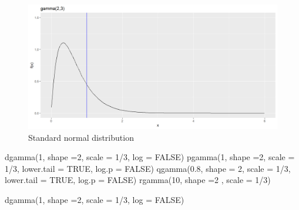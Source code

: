\documentclass[
]{book}
\newenvironment{Shaded}{\begin{snugshade}}{\end{snugshade}}
\newcommand{\AttributeTok}[1]{\textcolor[rgb]{0.77,0.63,0.00}{#1}}
\newcommand{\ConstantTok}[1]{\textcolor[rgb]{0.00,0.00,0.00}{#1}}
\newcommand{\DecValTok}[1]{\textcolor[rgb]{0.00,0.00,0.81}{#1}}
\newcommand{\FloatTok}[1]{\textcolor[rgb]{0.00,0.00,0.81}{#1}}
\newcommand{\FunctionTok}[1]{\textcolor[rgb]{0.00,0.00,0.00}{#1}}
\newcommand{\NormalTok}[1]{#1}
\newcommand{\SpecialCharTok}[1]{\textcolor[rgb]{0.00,0.00,0.00}{#1}}
\begin{document}
\begin{figure}

{\centering \includegraphics{figure/gamma-1} 

}

\caption{Standard normal distribution}\label{fig:gamma}
\end{figure}

\begin{Shaded}
\begin{Highlighting}[]
\FunctionTok{dgamma}\NormalTok{(}\DecValTok{1}\NormalTok{, }\AttributeTok{shape =}\DecValTok{2}\NormalTok{, }\AttributeTok{scale =} \DecValTok{1}\SpecialCharTok{/}\DecValTok{3}\NormalTok{, }\AttributeTok{log =} \ConstantTok{FALSE}\NormalTok{)}
\FunctionTok{pgamma}\NormalTok{(}\DecValTok{1}\NormalTok{, }\AttributeTok{shape =}\DecValTok{2}\NormalTok{, }\AttributeTok{scale =} \DecValTok{1}\SpecialCharTok{/}\DecValTok{3}\NormalTok{, }\AttributeTok{lower.tail =} \ConstantTok{TRUE}\NormalTok{,}
       \AttributeTok{log.p =} \ConstantTok{FALSE}\NormalTok{)}
\FunctionTok{qgamma}\NormalTok{(}\FloatTok{0.8}\NormalTok{, }\AttributeTok{shape =} \DecValTok{2}\NormalTok{,  }\AttributeTok{scale =} \DecValTok{1}\SpecialCharTok{/}\DecValTok{3}\NormalTok{, }\AttributeTok{lower.tail =} \ConstantTok{TRUE}\NormalTok{,}
       \AttributeTok{log.p =} \ConstantTok{FALSE}\NormalTok{)}
\FunctionTok{rgamma}\NormalTok{(}\DecValTok{10}\NormalTok{, }\AttributeTok{shape =}\DecValTok{2}\NormalTok{ , }\AttributeTok{scale =} \DecValTok{1}\SpecialCharTok{/}\DecValTok{3}\NormalTok{)}
\end{Highlighting}
\end{Shaded}

\begin{Shaded}
\begin{Highlighting}[]
\FunctionTok{dgamma}\NormalTok{(}\DecValTok{1}\NormalTok{, }\AttributeTok{shape =}\DecValTok{2}\NormalTok{, }\AttributeTok{scale =} \DecValTok{1}\SpecialCharTok{/}\DecValTok{3}\NormalTok{, }\AttributeTok{log =} \ConstantTok{FALSE}\NormalTok{)}
\end{Highlighting}
\end{Shaded}
\end{document}
